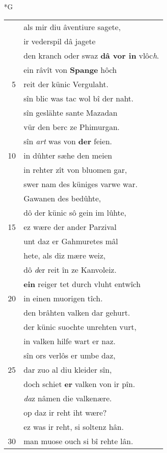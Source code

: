\documentclass[8pt,a4paper,notitlepage]{article}
\begin{document}
\begin{table}[ht]
\begin{minipage}[t]{0.5\linewidth}
\small
\begin{center}*G
\end{center}
\begin{tabular}{rl}
 & als mir diu âventiure sagete,\\ 
 & ir vederspil dâ jagete\\ 
 & den kranch oder swaz \textbf{dâ vor in} vlôc\textit{h}.\\ 
 & ein râvît von \textbf{Spange} hôch\\ 
5 & reit der künic Vergulaht.\\ 
 & sîn blic was tac wol bî der naht.\\ 
 & sîn geslähte sante Mazadan\\ 
 & vür den berc ze Phimurgan.\\ 
 & sîn \textit{art} was von \textbf{der} feien.\\ 
10 & in dûhter sæhe den meien\\ 
 & in rehter zît von bluomen gar,\\ 
 & swer nam des küniges varwe war.\\ 
 & Gawanen des bedûhte,\\ 
 & dô der künic sô gein im lûhte,\\ 
15 & ez wære der ander Parzival\\ 
 & unt daz er Gahmuretes mâl\\ 
 & hete, als diz mære weiz,\\ 
 & dô \textit{d}er reit în ze Kanvoleiz.\\ 
 & \textbf{ein} reiger tet durch vluht entwîch\\ 
20 & in einen muorigen tîch.\\ 
 & den brâhten valken dar gehurt.\\ 
 & der künic suochte unrehten vurt,\\ 
 & in valken hilfe wart er naz.\\ 
 & sîn ors verlôs er umbe daz,\\ 
25 & dar zuo al diu kleider sîn,\\ 
 & doch schiet \textbf{er} valken von ir pîn.\\ 
 & \textit{da}z nâmen die valkenære.\\ 
 & op daz ir reht iht wære?\\ 
 & ez was ir reht, si soltenz hân.\\ 
30 & man muose ouch si bî rehte lân.\\ 

\end{tabular}
\end{minipage}
\end{table}
\end{document}
